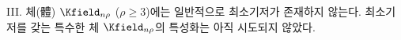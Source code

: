 
III. 체(體) $\Kfield_{n\rho}$ ($\rho\ge3$)에는 일반적으로 최소기저가 존재하지 않는다. 최소기저를 갖는 특수한 체 $\Kfield_{n\rho}$의 특성화는 아직 시도되지 않았다.
